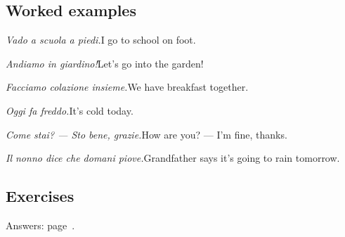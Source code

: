 \documentclass[11pt,a4paper,twoside,openright]{book}
\begin{document}
\subsection*{Worked examples}
\begin{examples}
\item\relax \textit{Vado a scuola a piedi.}\newline I go to school on foot.
\item\relax \textit{Andiamo in giardino!}\newline Let's go into the garden!
\item\relax \textit{Facciamo colazione insieme.}\newline We have breakfast together.
\item\relax \textit{Oggi fa freddo.}\newline It's cold today.
\item\relax \textit{Come stai? — Sto bene, grazie.}\newline How are you? — I'm fine, thanks.
\item\relax \textit{Il nonno dice che domani piove.}\newline Grandfather says it's going to rain tomorrow.
\end{examples}

\subsection*{Exercises}\label{les:andare-fare-stare-dire:exercises}
{\color{muted}\small Answers: page~\pageref{ans:andare-fare-stare-dire}.}
\end{document}

